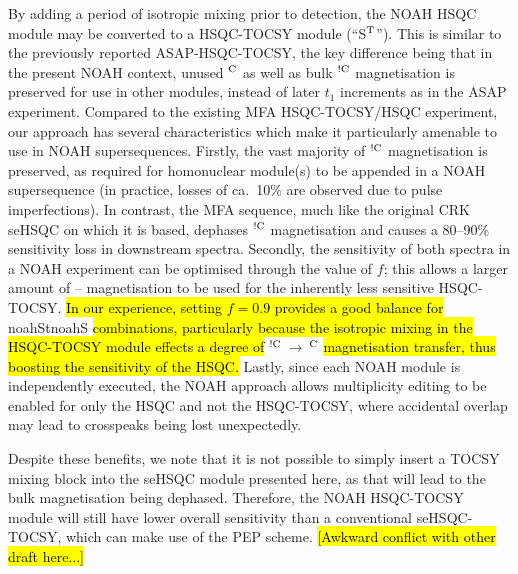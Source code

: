 \documentclass[11pt]{article}
\newcommand*{\noahtwo}[2]{\csname noah#1\endcsname\csname noah#2\endcsname}
\newcommand*{\noahSt}{S$\rm ^T$}
\newcommand*{\carbon}{\ce{^{13}C}}
\newcommand*{\proton}{\ce{^{1}H}}
\newcommand*{\magn}[1]{\ce{^1H}$^{#1}$}
\newcommand*{\magnnot}[1]{\ce{^1H}$^{!#1}$}
\begin{document}
By adding a period of isotropic mixing prior to detection, the NOAH HSQC module may be converted to a HSQC-TOCSY module (``\noahSt{}'').
This is similar to the previously reported ASAP-HSQC-TOCSY,\autocite{Becker2019JMR} the key difference being that in the present NOAH context, unused \magn{\ce{C}} as well as bulk \magnnot{\ce{C}} magnetisation is preserved for use in other modules, instead of later $t_1$ increments as in the ASAP experiment.
Compared to the existing MFA HSQC-TOCSY/HSQC experiment,\autocite{Nolis2019CPC} our approach has several characteristics which make it particularly amenable to use in NOAH supersequences.
Firstly, the vast majority of \magnnot{\ce{C}} magnetisation is preserved, as required for homonuclear module(s) to be appended in a NOAH supersequence (in practice, losses of ca.\ 10\% are observed due to pulse imperfections).
In contrast, the MFA sequence, much like the original CRK seHSQC on which it is based, dephases \magnnot{\ce{C}} magnetisation and causes a 80--90\% sensitivity loss in downstream spectra.
Secondly, the sensitivity of both spectra in a NOAH experiment can be optimised through the value of $f$; this allows a larger amount of \carbon{}--\proton{} magnetisation to be used for the inherently less sensitive HSQC-TOCSY.
\hl{In our experience, setting $f = 0.9$ provides a good balance for} \noahtwo{St}{S} \hl{combinations, particularly because the isotropic mixing in the HSQC-TOCSY module effects a degree of} \magnnot{\ce{C}}\,$\to\,$\magn{\ce{C}} \hl{magnetisation transfer, thus boosting the sensitivity of the HSQC.}
Lastly, since each NOAH module is independently executed, the NOAH approach allows multiplicity editing to be enabled for only the HSQC and not the HSQC-TOCSY, where accidental overlap may lead to crosspeaks being lost unexpectedly.

Despite these benefits, we note that it is not possible to simply insert a TOCSY mixing block into the seHSQC module presented here, as that will lead to the bulk magnetisation being dephased.
Therefore, the NOAH HSQC-TOCSY module will still have lower overall sensitivity than a conventional seHSQC-TOCSY, which can make use of the PEP scheme.
\hl{[Awkward conflict with other draft here...]}

\end{document}
